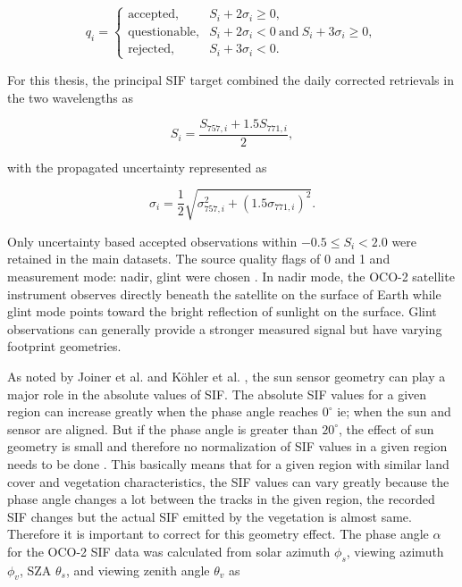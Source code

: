 \begin{equation}
q_i=
\begin{cases}
\text{accepted}, & S_i+2\sigma_i\geq 0,\\
\text{questionable}, & S_i+2\sigma_i<0\ \text{and}\ S_i+3\sigma_i\geq0,\\
\text{rejected}, & S_i+3\sigma_i<0.
\end{cases}
\label{eq:sif_negative_quality}
\end{equation}

For this thesis, the principal SIF target combined the daily corrected retrievals in the two wavelengths as 

\begin{equation}
S_i=\frac{S_{757,i}+1.5S_{771,i}}{2},
\label{eq:background_combined_sif}
\end{equation}

with the propagated uncertainty represented as

\begin{equation}
\sigma_i=\frac{1}{2}\sqrt{\sigma_{757,i}^{2}+\left(1.5\sigma_{771,i}\right)^{2}}.
\label{eq:background_combined_sif_uncertainty}
\end{equation}

Only uncertainty based accepted observations within \(-0.5\leq S_i<2.0\) were retained in the main datasets. The source quality flags of 0 and 1 and measurement mode: nadir, glint were chosen \cite{oco2_sif_v11r,oco2_sif_v112r}. In nadir mode, the OCO-2 satellite instrument observes directly beneath the satellite on the surface of Earth while glint mode points toward the bright reflection of sunlight on the surface. Glint observations can generally provide a stronger measured signal but have varying footprint geometries.

As noted by Joiner et al. \cite{joiner2020systematic} and Köhler et al. \cite{kohler2018global}, the sun sensor geometry can play a major role in the absolute values of SIF. The absolute SIF values for a given region can increase greatly when the phase angle reaches $0^{\circ}$ ie; when the sun and sensor are aligned. But if the phase angle is greater than $20^{\circ}$, the effect of sun geometry is small and therefore no normalization of SIF values in a given region needs to be done \cite{kohler2018global, doughty2022global}. This basically means that for a given region with similar land cover and vegetation characteristics, the SIF values can vary greatly because the phase angle changes a lot between the tracks in the given region, the recorded SIF changes but the actual SIF emitted by the vegetation is almost same. Therefore it is important to correct for this geometry effect. The phase angle $\alpha$ for the OCO-2 SIF data was calculated from solar azimuth \(\phi_s\), viewing azimuth \(\phi_v\), SZA \(\theta_s\), and viewing zenith angle \(\theta_v\) as 


